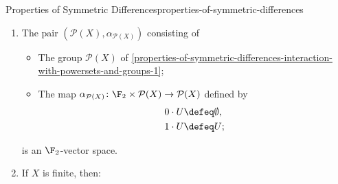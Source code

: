 \begin{proposition}{Properties of Symmetric Differences}{properties-of-symmetric-differences}
\begin{enumerate}
\begin{enumerate}
{\begin{enumerate}
                                \[
                                    (\mathcal{P}(\pt),\sdiff,\emptyset,\id_{\mathcal{P}(\pt)})
                                    \cong
                                    \Zn{2}.
                                \]%
                            \item When $X=\{0,1\}$, we have an isomorphism of groups between $\mathcal{P}(\{0,1\})$ and $\Zn{2}\times\Zn{2}$:
                                \[
                                    (\mathcal{P}(\{0,1\}),\sdiff,\emptyset,\id_{\mathcal{P}(\{0,1\})})
                                    \cong
                                    \Zn{2}\times\Zn{2}.
                                \]%
                        \end{enumerate}
                        \par\vspace*{-1.5\baselineskip}
                    }%
                \item\label{properties-of-symmetric-differences-interaction-with-powersets-and-groups-b}Every element of $\mathcal{P}(X)$ has order $2$ with respect to $\sdiff$, and thus $\mathcal{P}(X)$ is a \emph{Boolean group} (i.e.\ an abelian $2$-group).
            \end{enumerate}
        \item\label{properties-of-symmetric-differences-interaction-with-powersets-and-vector-spaces-1}The pair $(\mathcal{P}(X),\alpha_{\mathcal{P}(X)})$ consisting of
            \begin{itemize}
                \item The group $\mathcal{P}(X)$ of \cref{properties-of-symmetric-differences-interaction-with-powersets-and-groups-1};
                \item The map $\alpha_{\mathcal{P}(X)}\colon\F_{2}\times\mathcal{P}(X)\to\mathcal{P}(X)$ defined by
                    \begin{align*}
                        0\cdot U &\defeq \emptyset,\\
                        1\cdot U &\defeq U;
                    \end{align*}
            \end{itemize}
            is an $\F_{2}$-vector space.
        \item\label{properties-of-symmetric-differences-interaction-with-powersets-and-vector-spaces-2}If $X$ is finite, then:

\end{enumerate}
\end{proposition}
